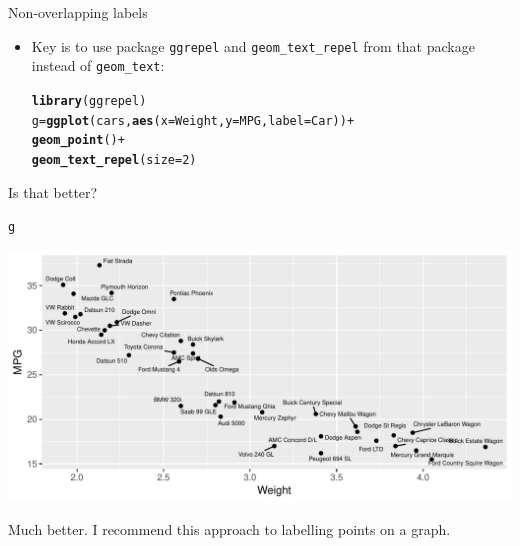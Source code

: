 \documentclass[unknownkeysallowed]{beamer}\usepackage[]{graphicx}\usepackage[]{color}
\makeatletter
\def\maxwidth{ %
  \ifdim\Gin@nat@width>\linewidth
    \linewidth
  \else
    \Gin@nat@width
  \fi
}
\newcommand{\hlnum}[1]{\textcolor[rgb]{0.686,0.059,0.569}{#1}}%
\newcommand{\hlopt}[1]{\textcolor[rgb]{0,0,0}{#1}}%
\newcommand{\hlstd}[1]{\textcolor[rgb]{0.345,0.345,0.345}{#1}}%
\newcommand{\hlkwb}[1]{\textcolor[rgb]{0.69,0.353,0.396}{#1}}%
\newcommand{\hlkwc}[1]{\textcolor[rgb]{0.333,0.667,0.333}{#1}}%
\newcommand{\hlkwd}[1]{\textcolor[rgb]{0.737,0.353,0.396}{\textbf{#1}}}%
\newenvironment{kframe}{%
 \def\at@end@of@kframe{}%
 \ifinner\ifhmode%
  \def\at@end@of@kframe{\end{minipage}}%
  \begin{minipage}{\columnwidth}%
 \fi\fi%
 \def\FrameCommand##1{\hskip\@totalleftmargin \hskip-\fboxsep
 \colorbox{shadecolor}{##1}\hskip-\fboxsep
     \hskip-\linewidth \hskip-\@totalleftmargin \hskip\columnwidth}%
 \MakeFramed {\advance\hsize-\width
   \@totalleftmargin\z@ \linewidth\hsize
   \@setminipage}}%
 {\par\unskip\endMakeFramed%
 \at@end@of@kframe}
\newenvironment{knitrout}{}{} %
\makeatother
\begin{document}
\begin{frame}[fragile]{Non-overlapping labels}
  
  \begin{itemize}
  \item Key is to use package \texttt{ggrepel} and
    \verb+geom_text_repel+ from that package instead of \verb+geom_text+:

\begin{knitrout}
\color{fgcolor}\begin{kframe}
\begin{alltt}
\hlkwd{library}\hlstd{(ggrepel)}
\hlstd{g}\hlkwb{=}\hlkwd{ggplot}\hlstd{(cars,}\hlkwd{aes}\hlstd{(}\hlkwc{x}\hlstd{=Weight,}\hlkwc{y}\hlstd{=MPG,}\hlkwc{label}\hlstd{=Car))}\hlopt{+}
  \hlkwd{geom_point}\hlstd{()}\hlopt{+}
  \hlkwd{geom_text_repel}\hlstd{(}\hlkwc{size}\hlstd{=}\hlnum{2}\hlstd{)}
\end{alltt}
\end{kframe}
\end{knitrout}
  \end{itemize}
  
\end{frame}

\begin{frame}[fragile]{Is that better?}
  
\begin{knitrout}
\color{fgcolor}\begin{kframe}
\begin{alltt}
\hlstd{g}
\end{alltt}
\end{kframe}
\includegraphics[width=\maxwidth]{figure/unnamed-chunk-425-1} 

\end{knitrout}

Much better. I recommend this approach to labelling points on a graph.
  
\end{frame}
\end{document}
